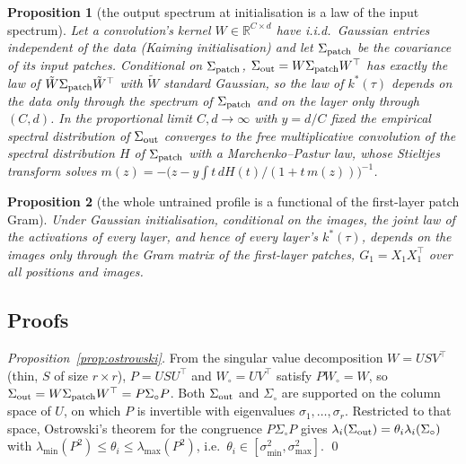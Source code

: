\documentclass[10pt,journal,compsoc]{IEEEtran}
\newtheorem{proposition}{Proposition}
\begin{document}
\begin{proposition}[the output spectrum at initialisation is a law of the input spectrum]
\label{prop:law}
Let a convolution's kernel $W \in \mathbb{R}^{C \times d}$ have i.i.d.\ Gaussian entries independent of the data (Kaiming initialisation) and let $\Sigma_{\rm patch}$ be the covariance of its input patches. Conditional on $\Sigma_{\rm patch}$, $\Sigma_{\rm out} = W\Sigma_{\rm patch}W^{\top}$ has exactly the law of $\tilde W \Sigma_{\rm patch} \tilde W^{\top}$ with $\tilde W$ standard Gaussian, so the law of $k^*(\tau)$ depends on the data only through the spectrum of $\Sigma_{\rm patch}$ and on the layer only through $(C, d)$. In the proportional limit $C, d \to \infty$ with $y = d/C$ fixed the empirical spectral distribution of $\Sigma_{\rm out}$ converges to the free multiplicative convolution of the spectral distribution $H$ of $\Sigma_{\rm patch}$ with a Marchenko--Pastur law, whose Stieltjes transform solves $m(z) = -\bigl(z - y\int t\,dH(t)/(1 + t\,m(z))\bigr)^{-1}$.
\end{proposition}


\begin{proposition}[the whole untrained profile is a functional of the first-layer patch Gram]
\label{prop:gram}
Under Gaussian initialisation, conditional on the images, the joint law of the activations of every layer, and hence of every layer's $k^*(\tau)$, depends on the images only through the Gram matrix of the first-layer patches, $G_1 = X_1 X_1^{\top}$ over all positions and images.
\end{proposition}

\subsection*{Proofs}


\emph{Proposition~\ref{prop:ostrowski}.} From the singular value
decomposition $W = U S V^{\top}$ (thin, $S$ of size $r \times r$),
$P = U S U^{\top}$ and $W_{\circ} = U V^{\top}$ satisfy $P W_{\circ} = W$, so
$\Sigma_{\rm out} = W \Sigma_{\rm patch} W^{\top} = P \Sigma_{\circ} P$.
Both $\Sigma_{\rm out}$ and $\Sigma_{\circ}$ are supported on the column
space of $U$, on which $P$ is invertible with eigenvalues
$\sigma_1, \ldots, \sigma_r$. Restricted to that space, Ostrowski's theorem
\cite[Thm.~4.5.9]{horn2013matrix} for the congruence $P \Sigma_{\circ} P$
gives $\lambda_i(\Sigma_{\rm out}) = \theta_i \lambda_i(\Sigma_{\circ})$ with
$\lambda_{\min}(P^2) \le \theta_i \le \lambda_{\max}(P^2)$, i.e.\
$\theta_i \in [\sigma_{\min}^2, \sigma_{\max}^2]$. \qed
\end{document}
